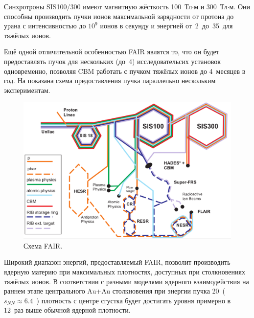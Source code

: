 Синхротроны SIS100/300 имеют магнитную жёсткость 100~Тл$\cdot$м и 300~Тл$\cdot$м. Они способны производить пучки ионов максимальной зарядности от протона до урана с интенсивностью до $10^9$ ионов в секунду и энергией от~2~до~35~\GeVperNucl для тяжёлых ионов.


Ещё одной отличительной особенностью FAIR являтся то, что он будет предоставлять пучок для нескольких (до~4) исследовательсих установок одновременно, позволяя CBM работать с пучком тяжёлых ионов до 4~месяцев в год. На  показана схема предоставления пучка параллельно нескольким экспериментам.


\begin{figure}[H]
\includegraphics[width=1.0\textwidth]{pictures/FAIR_structure_3.png}
\caption{Схема FAIR.}
\label{fig:FAIRstructure3}
\end{figure}

Широкий диапазон энергий, предоставляемый FAIR, позволит производить ядерную материю при максимальных плотностях, доступных при столкновениях тяжёлых ионов. В соответствии с разными моделями ядерного взаимодействия на раннем этапе центрального Au+Au столкновения при энергии пучка 20~\GeVperNucl ($s_{NN} \approx 6.4$~\GeV) плотность с центре сгустка будет достигать уровня примерно в 12~раз выше обычной ядерной плотности.

